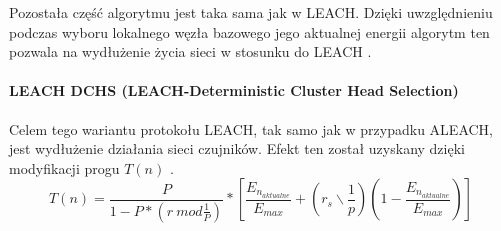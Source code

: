 Pozostała część algorytmu jest taka sama jak w LEACH. Dzięki uwzględnieniu podczas wyboru lokalnego węzła bazowego jego aktualnej energii algorytm ten pozwala na wydłużenie życia sieci w stosunku do LEACH \cite{Singh2017}.
\paragraph{LEACH DCHS (LEACH-Deterministic Cluster Head Selection)}
Celem tego wariantu protokołu LEACH, tak samo jak w przypadku ALEACH, jest wydłużenie działania sieci czujników. Efekt ten został uzyskany dzięki modyfikacji progu $T(n)$ \cite{Handy2002, Singh2017}.
 \[
	T(n) =  \frac{P}{1 - P * (r \:mod \frac{1}{P})} * \left[\frac{E_{n_{aktualne}}}{E_{max}} + \left(r_{s} \backslash \frac{1}{p}\right)\left(1 - \frac{E_{n_{aktualne}}}{E_{max}}\right)\right]
\]